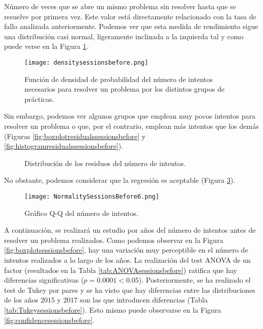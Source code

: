 Número de veces que se abre un mismo problema sin resolver hasta que se resuelve por primera vez. Este valor está directamente relacionado con la tasa de fallo analizada anteriormente. Podemos ver que esta medida de rendimiento sigue una distribución casi normal, ligeramente inclinada a la izquierda tal y como puede verse en la Figura \ref{fig:densityplotsessionsbefore}.

\begin{figure}[H]
    \centering
    \texttt{[image: densitysessionsbefore.png]}
    \caption{Función de densidad de probabilidad del número de intentos necesarios para resolver un problema por los distintos grupos de prácticas.}
    \label{fig:densityplotsessionsbefore}
\end{figure}

Sin embargo, podemos ver algunos grupos que emplean muy pocos intentos para resolver un problema o que, por el contrario, emplean más intentos que los demás (Figuras \ref{fig:boxplotresidualssessionsbefore} y \ref{fig:histogramresidualssessionsbefore}).

\begin{figure}[H]
\centering
{}\qquad
{}
\caption{Distribución de los residuos del número de intentos.}
\label{fig:sessionsbefore}
\end{figure}

No obstante, podemos considerar que la regresión es aceptable (Figura \ref{fig:q-qsessionsbefore}).

\begin{figure}[H]
    \centering
    \texttt{[image: NormalitySessionsBefore6.png]}
    \caption{Gráfico Q-Q del número de intentos.}
    \label{fig:q-qsessionsbefore}
\end{figure}

A continuación, se realizará un estudio por años del número de intentos antes de resolver un problema realizados. Como podemos observar en la Figura \ref{fig:boxplotsessionsbefore}, hay una variación muy perceptible en el número de intentos realizados a lo largo de los años. La realización del test ANOVA de un factor (resultados en la Tabla \ref{tab:ANOVAsessionsbefore}) ratifica que hay diferencias significativas ($p = 0.0001 < 0.05$). Posteriormente, se ha realizado el test de Tukey por pares y se ha visto que hay diferencias entre las distribuciones de los años $2015$ y $2017$ son las que introducen diferencias (Tabla \ref{tab:Tukeysessionsbefore}). Esto mismo puede observarse en la Figura \ref{fig:confidencesessionsbefore}.

